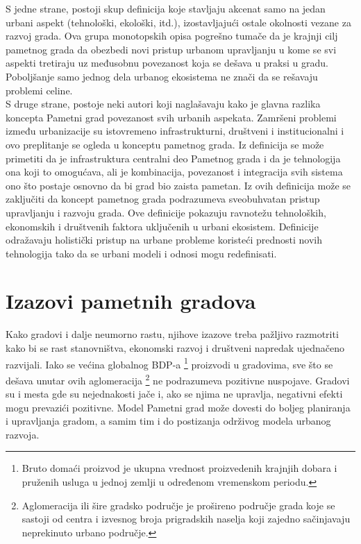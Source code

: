 \documentclass[a4paper,12pt]{article}
\begin{document}
{S jedne strane, postoji skup definicija koje stavljaju akcenat samo na jedan urbani aspekt (tehnološki, ekološki, itd.), izostavljajući ostale okolnosti vezane za razvoj grada. Ova grupa monotopskih opisa pogrešno tumače da je krajnji cilj pametnog grada da obezbedi novi pristup urbanom upravljanju u kome se svi aspekti tretiraju uz međusobnu povezanost koja se dešava u praksi u gradu. Poboljšanje samo jednog dela urbanog ekosistema ne znači da se rešavaju problemi celine. \\

S druge strane, postoje neki autori koji naglašavaju kako je glavna razlika koncepta Pametni grad povezanost svih urbanih aspekata. Zamršeni problemi između urbanizacije su istovremeno infrastrukturni, društveni i institucionalni i ovo preplitanje se ogleda u konceptu pametnog grada. Iz definicija se može primetiti da je infrastruktura centralni deo Pametnog grada i da je tehnologija ona koji to omogućava, ali je kombinacija, povezanost i integracija svih sistema ono što postaje osnovno da bi grad bio zaista pametan. Iz ovih definicija može se zaključiti da koncept pametnog grada podrazumeva sveobuhvatan pristup upravljanju i razvoju grada. Ove definicije pokazuju ravnotežu tehnoloških, ekonomskih i društvenih faktora uključenih u urbani ekosistem. Definicije odražavaju holistički pristup na urbane probleme koristeći prednosti novih tehnologija tako da se urbani modeli i odnosi mogu redefinisati.\\




\section{Izazovi pametnih gradova}	
\label{sec:termini_i_citiranje}


 Kako gradovi i dalje neumorno rastu, njihove izazove treba pažljivo razmotriti kako bi se rast stanovništva, ekonomski razvoj i društveni napredak ujednačeno razvijali. Iako se većina globalnog BDP-a \footnote{Bruto domaći proizvod je ukupna vrednost proizvedenih krajnjih dobara i pruženih usluga u jednoj zemlji u određenom vremenskom periodu. } proizvodi u gradovima, sve što se dešava unutar ovih aglomeracija \footnote{Aglomeracija ili šire gradsko područje je prošireno područje grada koje se sastoji od centra i izvesnog broja prigradskih naselja koji zajedno sačinjavaju neprekinuto urbano područje.
} ne podrazumeva pozitivne nuspojave. Gradovi su i mesta gde su nejednakosti jače i, ako se njima ne upravlja, negativni efekti mogu prevazići pozitivne. Model Pametni grad može dovesti do boljeg planiranja i upravljanja gradom, a samim tim i do postizanja održivog modela urbanog razvoja. \\

}
\end{document}
